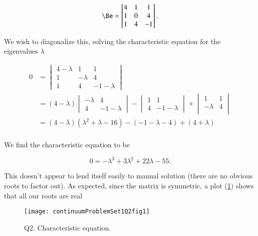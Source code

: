 \begin{equation}\label{eqn:continuumProblemSet1:270}
\Be =
\begin{bmatrix}
4 & 1 & 1 \\
1 & 0 & 4 \\
1 & 4 & -1
\end{bmatrix}.
\end{equation}

We wish to diagonalize this, solving the characteristic equation for the eigenvalues $\lambda$

\begin{align*}
0 &=
\begin{vmatrix}
4 -\lambda & 1 & 1 \\
1 & -\lambda & 4 \\
1 & 4 & -1 -\lambda
\end{vmatrix} \\
&=
(4 -\lambda )
\begin{vmatrix}
 -\lambda & 4 \\
 4 & -1 -\lambda
\end{vmatrix}
-
\begin{vmatrix}
1 & 1 \\
4 & -1 -\lambda
\end{vmatrix}
+
\begin{vmatrix}
1 & 1 \\
-\lambda & 4 \\
\end{vmatrix} \\
&=
(4 - \lambda)(\lambda^2 + \lambda - 16)
-(-1 -\lambda - 4)
+(4 + \lambda) \\
\end{align*}

We find the characteristic equation to be

\begin{equation}\label{eqn:continuumProblemSet1:290}
0 = -\lambda^3 + 3 \lambda^2 + 22\lambda - 55.
\end{equation}

This doesn't appear to lend itself easily to manual solution (there are no obvious roots to factor out).  As expected, since the matrix is symmetric, a plot (\ref{fig:continuumL8:continuumProblemSet1Q2fig1}) shows that all our roots are real

\begin{figure}[htp]
   \centering
   \texttt{[image: continuumProblemSet1Q2fig1]}
   \caption{Q2.  Characteristic equation.}\label{fig:continuumL8:continuumProblemSet1Q2fig1}
\end{figure}

